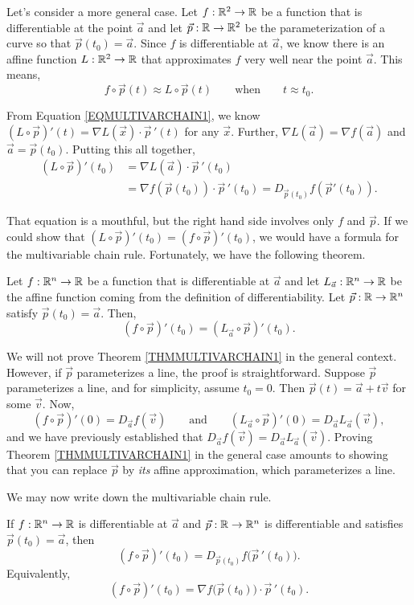 Let's consider a more general case.  Let $f:\mathbb{R}^2\to\mathbb{R}$ be a
function that is differentiable at the point $\vec a$
and let $\vec p:\mathbb{R}\to\mathbb{R}^2$ be the parameterization of a curve so that
$\vec p(t_0)=\vec a$.
Since $f$ is differentiable at $\vec a$, we know there is an affine
function $L:\mathbb{R}^2\to\mathbb{R}$ that approximates $f$ very well near the point $\vec a$.
This means, 
\[
	f\circ \vec p(t) \approx L\circ \vec p(t)\qquad\text{when}\qquad t\approx t_0.
\]

From Equation \eqref{EQMULTIVARCHAIN1}, we know $(L\circ \vec p)'(t)=\nabla L(\vec x)\cdot
\vec p\,'(t)$ for any $\vec x$.  Further, $\nabla L(\vec a)=\nabla f(\vec a)$ and $\vec a=
\vec p(t_0)$.  Putting this all together,
\begin{align*}
	(L\circ \vec p)'(t_0) &= \nabla L(\vec a)\cdot \vec p\,'(t_0)\\
	&=\nabla f(\vec p(t_0))\cdot \vec p\,'(t_0) = D_{\vec p(t_0)} f(\vec p'(t_0)).
\end{align*}

That equation is a mouthful, but the right hand side involves only $f$ and $\vec p$.
If we could show that $(L\circ \vec p)'(t_0)=(f\circ \vec p)'(t_0)$, we would
have a formula for the multivariable chain rule.  Fortunately, we have the following
theorem.

\begin{theorem}
	\label{THMMULTIVARCHAIN1}
	Let $f:\mathbb{R}^n\to\mathbb{R}$ be a function that is differentiable at $\vec a$ and
	let $L_{\vec a}:\mathbb{R}^n\to\mathbb{R}$ be the affine function coming from
	the definition of differentiability.
	Let $\vec p:\mathbb{R}\to\mathbb{R}^n$ satisfy $\vec p(t_0)=\vec a$.  Then,
	\[
		(f\circ \vec p)'(t_0)=(L_{\vec a}\circ \vec p)'(t_0).
	\]
\end{theorem}

We will not prove Theorem \ref{THMMULTIVARCHAIN1} in the general context.
However, if $\vec p$ parameterizes a line, the proof is straightforward. 
Suppose $\vec p$ parameterizes a line, and for simplicity, assume 
$t_0=0$.  Then $\vec p(t) = \vec a+t\vec v$ for some $\vec v$.  Now,
\[
	(f\circ \vec p)'(0) = D_{\vec a}f(\vec v)\qquad\text{and}
	\qquad(L_{\vec a}\circ \vec p)'(0) = D_{\vec a}L_{\vec a}(\vec v),
\]
and we have previously established that $D_{\vec a}f(\vec v)=D_{\vec a}L_{\vec a}(\vec v)$.
Proving Theorem \ref{THMMULTIVARCHAIN1} in the general case amounts to
showing that you can replace $\vec p$ by \emph{its} affine approximation,
which parameterizes a line.

We may now write down the multivariable chain rule.
\begin{theorem}
	If $f:\mathbb{R}^n\to\mathbb{R}$ is differentiable at $\vec a$
	and $\vec p:\mathbb{R}\to\mathbb{R}^n$ is differentiable and
	satisfies $\vec p(t_0)=\vec a$, then
	\[
		(f\circ\vec p)'(t_0)=
		D_{\vec p(t_0)}f\big(\vec p\,'(t_0)\big).
	\]
	Equivalently,
	\[
		(f\circ\vec p)'(t_0)=
		\nabla f\big(\vec p(t_0)\big)\cdot\vec p\,'(t_0).
	\]
\end{theorem}

